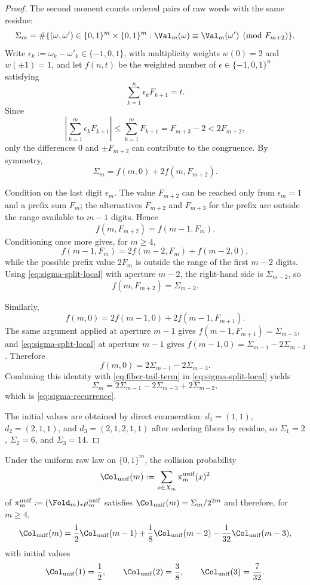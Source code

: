 \begin{proof}
The second moment counts ordered pairs of raw words with the same residue:
\[
\Sigma_m
=
\#\{(\omega,\omega')\in\{0,1\}^m\times\{0,1\}^m:
\Val_m(\omega)\equiv\Val_m(\omega')\pmod {F_{m+2}}\}.
\]
Write $\epsilon_k:=\omega_k-\omega'_k\in\{-1,0,1\}$, with multiplicity
weights $w(0)=2$ and $w(\pm1)=1$, and let $f(n,t)$ be the weighted number of
$\epsilon\in\{-1,0,1\}^n$ satisfying
\[
\sum_{k=1}^n\epsilon_kF_{k+1}=t.
\]
Since
\[
\left|\sum_{k=1}^m\epsilon_kF_{k+1}\right|
\le\sum_{k=1}^mF_{k+1}=F_{m+3}-2<2F_{m+2},
\]
only the differences $0$ and $\pm F_{m+2}$ can contribute to the congruence.
By symmetry,
\begin{equation}\label{eq:sigma-split-local}
\Sigma_m=f(m,0)+2f(m,F_{m+2}).
\end{equation}

Condition on the last digit $\epsilon_m$.  The value $F_{m+2}$ can be reached
only from $\epsilon_m=1$ and a prefix sum $F_m$; the alternatives
$F_{m+2}$ and $F_{m+3}$ for the prefix are outside the range available to
$m-1$ digits.  Hence
\[
f(m,F_{m+2})=f(m-1,F_m).
\]
Conditioning once more gives, for $m\ge4$,
\[
f(m-1,F_m)=2f(m-2,F_m)+f(m-2,0),
\]
while the possible prefix value $2F_m$ is outside the range of the first
$m-2$ digits.  Using \eqref{eq:sigma-split-local} with aperture $m-2$, the
right-hand side is $\Sigma_{m-2}$, so
\begin{equation}\label{eq:fiber-tail-term}
f(m,F_{m+2})=\Sigma_{m-2}.
\end{equation}

Similarly,
\[
f(m,0)=2f(m-1,0)+2f(m-1,F_{m+1}).
\]
The same argument applied at aperture $m-1$ gives
$f(m-1,F_{m+1})=\Sigma_{m-3}$, and
\eqref{eq:sigma-split-local} at aperture $m-1$ gives
$f(m-1,0)=\Sigma_{m-1}-2\Sigma_{m-3}$.  Therefore
\[
f(m,0)=2\Sigma_{m-1}-2\Sigma_{m-3}.
\]
Combining this identity with \eqref{eq:fiber-tail-term} in
\eqref{eq:sigma-split-local} yields
\[
\Sigma_m
=2\Sigma_{m-1}-2\Sigma_{m-3}+2\Sigma_{m-2},
\]
which is \eqref{eq:sigma-recurrence}.

The initial values are obtained by direct enumeration:
$d_1=(1,1)$, $d_2=(2,1,1)$, and $d_3=(2,1,2,1,1)$ after ordering fibers by
residue, so $\Sigma_1=2$, $\Sigma_2=6$, and $\Sigma_3=14$.
\end{proof}

\begin{proposition}\label{prop:uniform-collision}
Under the uniform raw law on $\{0,1\}^m$, the collision probability
\[
\Col_{\mathrm{unif}}(m):=
\sum_{x\in X_m}\pi_m^{\mathrm{unif}}(x)^2
\]
of $\pi_m^{\mathrm{unif}}:=(\Fold_m)_*\mu_m^{\mathrm{unif}}$ satisfies
$\Col_{\mathrm{unif}}(m)=\Sigma_m/2^{2m}$ and therefore, for $m\ge4$,
\[
\Col_{\mathrm{unif}}(m)
=\frac12\Col_{\mathrm{unif}}(m-1)
+\frac18\Col_{\mathrm{unif}}(m-2)
-\frac1{32}\Col_{\mathrm{unif}}(m-3),
\]
with initial values
\[
\Col_{\mathrm{unif}}(1)=\frac12,\qquad
\Col_{\mathrm{unif}}(2)=\frac38,\qquad
\Col_{\mathrm{unif}}(3)=\frac7{32}.
\]
\end{proposition}

